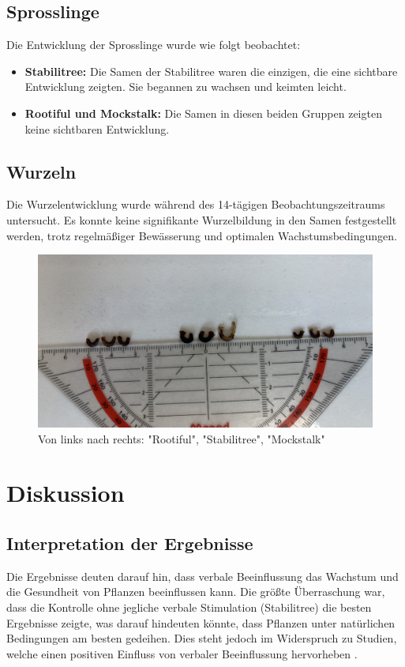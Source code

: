 \subsection{Sprosslinge}
Die Entwicklung der Sprosslinge wurde wie folgt beobachtet:
\begin{itemize}
    \item \textbf{Stabilitree:} Die Samen der Stabilitree waren die einzigen, die eine sichtbare Entwicklung zeigten. Sie begannen zu wachsen und keimten leicht.
    \item \textbf{Rootiful und Mockstalk:} Die Samen in diesen beiden Gruppen zeigten keine sichtbaren Entwicklung.
\end{itemize}

\subsection{Wurzeln}
Die Wurzelentwicklung wurde während des 14-tägigen Beobachtungszeitraums untersucht. Es konnte keine signifikante Wurzelbildung in den Samen festgestellt werden, trotz regelmäßiger Bewässerung und optimalen Wachstumsbedingungen.

\begin{figure} [H]
    \centering
    \centering
    \includegraphics[width=\textwidth]{SamenBild.jpeg}
    \caption{Von links nach rechts: "Rootiful", "Stabilitree", "Mockstalk"}
    \label{fig:enter-label}
\end{figure}

\pagebreak

\section{Diskussion}
\subsection{Interpretation der Ergebnisse}
Die Ergebnisse deuten darauf hin, dass verbale Beeinflussung das Wachstum und die Gesundheit von Pflanzen beeinflussen kann. Die größte Überraschung war, dass die Kontrolle ohne jegliche verbale Stimulation (Stabilitree) die besten Ergebnisse zeigte, was darauf hindeuten könnte, dass Pflanzen unter natürlichen Bedingungen am besten gedeihen. Dies steht jedoch im Widerspruch zu Studien, welche einen positiven Einfluss von verbaler Beeinflussung hervorheben \cite{Yi2003Effect, chowdhury-gupta2015}.

